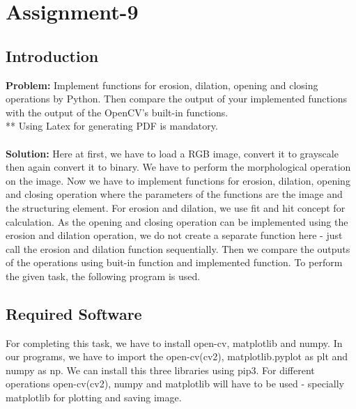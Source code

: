 \documentclass{article}
\begin{document}
{
    \section{Assignment-9}
    \subsection{Introduction}
    \textbf {Problem: }
    Implement functions for erosion, dilation, opening and closing operations by Python. Then compare the output of your implemented functions with the output of the OpenCV's built-in functions.\\
    ** Using Latex for generating PDF is mandatory.\\
    \\
    \textbf{Solution: }
    Here at first, we have to load a RGB image, convert it to grayscale then again convert it to binary. We have to perform the morphological operation on the image. Now we have to implement functions for erosion, dilation, opening and closing operation where the parameters of the functions are the image and the structuring element. For erosion and dilation, we use fit and hit concept for calculation. As the opening and closing operation can be implemented using the erosion and dilation operation, we do not create a separate function here - just call the erosion and dilation function sequentially. Then we compare the outputs of the operations using buit-in function and implemented function. To perform the given task, the following program is used.
    \\
    
    \subsection{Required Software}
    For completing this task, we have to install open-cv, matplotlib and numpy. In our programs, we have to import the open-cv(cv2), matplotlib.pyplot as plt and numpy as np. We can install this three libraries using pip3. For different operations open-cv(cv2), numpy and matplotlib will have to be used - specially matplotlib for plotting and saving image. 
    \\
    
}
\end{document}
